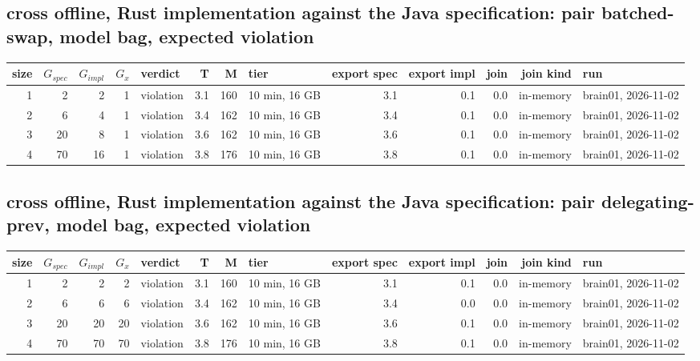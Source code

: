 \documentclass[10pt]{article}
\begin{document}
\subsection*{cross offline, Rust implementation against the Java specification: pair \textsf{batched-swap}, model bag, expected violation}
\begin{longtable}{@{}rrrrlrrlrrrrl@{}}
\toprule
size & $G_{\mathit{spec}}$ & $G_{\mathit{impl}}$ & $G_x$ & verdict & T & M & tier & export spec & export impl & join & join kind & run \\
\midrule
\endhead
\color{red} 1 & 2 & 2 & 1 & violation & 3.1 & 160 & 10 min, 16 GB & 3.1 & 0.1 & 0.0 & in-memory & brain01, 2026-11-02 \\
\color{red} 2 & 6 & 4 & 1 & violation & 3.4 & 162 & 10 min, 16 GB & 3.4 & 0.1 & 0.0 & in-memory & brain01, 2026-11-02 \\
\color{red} 3 & 20 & 8 & 1 & violation & 3.6 & 162 & 10 min, 16 GB & 3.6 & 0.1 & 0.0 & in-memory & brain01, 2026-11-02 \\
\color{red} 4 & 70 & 16 & 1 & violation & 3.8 & 176 & 10 min, 16 GB & 3.8 & 0.1 & 0.0 & in-memory & brain01, 2026-11-02 \\
\bottomrule
\end{longtable}
\subsection*{cross offline, Rust implementation against the Java specification: pair \textsf{delegating-prev}, model bag, expected violation}
\begin{longtable}{@{}rrrrlrrlrrrrl@{}}
\toprule
size & $G_{\mathit{spec}}$ & $G_{\mathit{impl}}$ & $G_x$ & verdict & T & M & tier & export spec & export impl & join & join kind & run \\
\midrule
\endhead
\color{red} 1 & 2 & 2 & 2 & violation & 3.1 & 160 & 10 min, 16 GB & 3.1 & 0.1 & 0.0 & in-memory & brain01, 2026-11-02 \\
\color{red} 2 & 6 & 6 & 6 & violation & 3.4 & 162 & 10 min, 16 GB & 3.4 & 0.0 & 0.0 & in-memory & brain01, 2026-11-02 \\
\color{red} 3 & 20 & 20 & 20 & violation & 3.6 & 162 & 10 min, 16 GB & 3.6 & 0.1 & 0.0 & in-memory & brain01, 2026-11-02 \\
\color{red} 4 & 70 & 70 & 70 & violation & 3.8 & 176 & 10 min, 16 GB & 3.8 & 0.1 & 0.0 & in-memory & brain01, 2026-11-02 \\
\bottomrule
\end{longtable}
\end{document}
